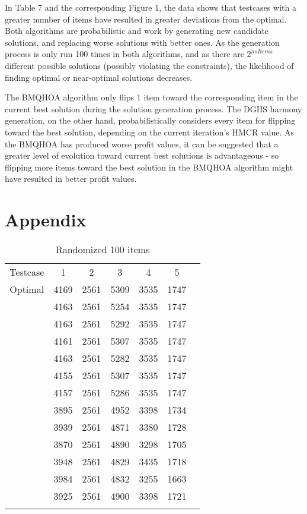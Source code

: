 \documentclass[titlepage]{article}
\begin{document}
In Table 7 and the corresponding Figure 1, the data shows that testcases with a greater number of items have resulted in greater deviations from the optimal. Both algorithms are probabilistic and work by generating new candidate solutions, and replacing worse solutions with better ones. As the generation process is only run 100 times in both algorithms, and as there are $2^{noItems}$ different possible solutions (possibly violating the constraints), the likelihood of finding optimal or near-optimal solutions decreases.

The BMQHOA algorithm only flips 1 item toward the corresponding item in the current best solution during the solution generation process. The DGHS harmony generation, on the other hand, probabilistically considers every item for flipping toward the best solution, depending on the current iteration's HMCR value.  As the BMQHOA has produced worse profit values, it can be suggested that a greater level of evolution toward current best solutions is advantageous - so flipping more items toward the best solution in the BMQHOA algorithm might have resulted in better profit values. 

\newpage





\section{Appendix}
\begin{table}[!h]\centering
    \caption{Randomized 100 items} \label{random100}
    \begin{tabu}{|c|c|c|c|c|c|c|}
        Testcase & 1 & 2 & 3 & 4 & 5 \\ [-1pt]  
        Optimal & 4169 & 2561 & 5309 & 3535 & 1747 \\ [-1pt]  
         & 4163 & 2561 & 5254 & 3535 & 1747 \\ 
        & 4163 & 2561 &5292 &3535 &1747 \\  
        &4161 &2561 &5307 &3535 &1747 \\  
        &4163 &2561 &5282 &3535 &1747 \\  
        &4155 &2561 &5307 &3535 &1747 \\  
        &4157 &2561 &5286 &3535 &1747 \\[-1pt] 
         &3895 &2561 &4952 &3398 &1734 \\ 
        &3939 &2561 &4871 &3380 &1728 \\ 
        &3870 &2561 &4890 &3298 &1705 \\ 
        &3948 &2561 &4829 &3435 &1718 \\ 
        &3984 &2561 &4832 &3255 &1663 \\ 
        &3925 &2561 &4900 &3398 &1721 \\[-1pt] 
    \end{tabu}
\end{table}
\end{document}
